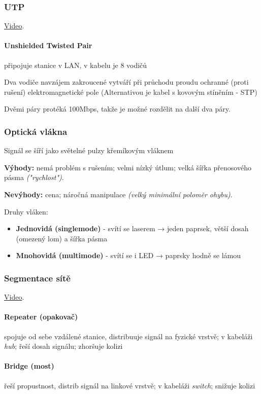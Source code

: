 \documentclass[10pt,a4paper]{article}
\begin{document}
\subsubsection{UTP}

\href{https://youtu.be/_NX99ad2FUA}{Video}.

\paragraph*{Unshielded Twisted Pair} připojuje stanice v LAN, v kabelu je 8 vodičů

Dva vodiče navzájem zakroucené vytváří při průchodu proudu ochranné (proti rušení) elektromagnetické pole (Alternativou je kabel s kovovým stíněním - STP)

Dvěmi páry protéká 100Mbps, takže je možné rozdělit na další dva páry.

\subsubsection{Optická vlákna}

Signál se šíří jako světelné pulzy křemíkovým vláknem

\textbf{Výhody:} nemá problém s rušením; velmi nízký útlum; velká šířka přenosového pásma \textit{("rychlost")}.

\textbf{Nevýhody:} cena; náročná manipulace \textit{(velký minimální poloměr ohybu)}.

Druhy vláken:
\begin{itemize}
    \item \textbf{Jednovidá (singlemode)} - svítí se laserem → jeden paprsek, větší dosah (omezený lom) a šířka pásma
    \item \textbf{Mnohovidá (multimode)} - svítí se i LED → paprsky hodně se lámou
\end{itemize}

\subsubsection{Segmentace sítě}

\href{https://youtu.be/1z0ULvg_pW8}{Video}.

\paragraph*{Repeater (opakovač)} spojuje od sebe vzdálené stanice, distribuuje signál na fyzické vrstvě; v kabeláži \textit{hub}; řeší dosah signálu; zhoršuje kolizi
\paragraph*{Bridge (most)} řeší propustnost, distrib signál na linkové vrstvě; v kabeláži \textit{switch}; snižuje kolizi
\end{document}
